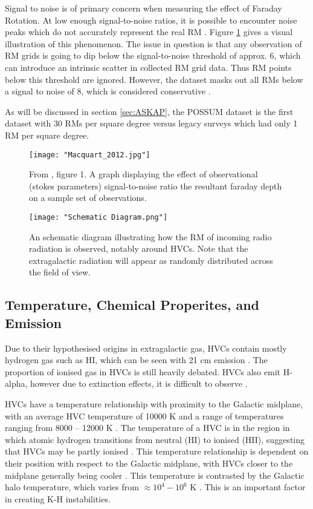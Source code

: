 Signal to noise is of primary concern when measuring the effect of Faraday Rotation. At low enough signal-to-noise ratios, it is possible to encounter noise peaks which do not accurately represent the real RM \citep{ID60}. Figure \ref{fig:snr} gives a visual illustration of this phenomenon. The issue in question is that any observation of RM grids is going to dip below the signal-to-noise threshold of approx. 6, which can introduce an intrinsic scatter in collected RM grid data. Thus RM points below this threshold are ignored. However, the dataset masks out all RMs below a signal to noise of 8, which is considered conservative \citep{ID71}.

As will be discussed in section \ref{sec:ASKAP}, the POSSUM dataset is the first dataset with 30 RMs per square degree versus legacy surveys which had only 1 RM per square degree.

\begin{figure}
    \texttt{[image: "Macquart\_2012.jpg"]}
    \centering
    \caption{From \cite{ID60}, figure 1. A graph displaying the effect of observational (stokes parameters) signal-to-noise ratio the resultant faraday depth on a sample set of observations.}
    \label{fig:snr}
\end{figure}

\begin{figure}
    \texttt{[image: "Schematic Diagram.png"]}
    \centering
    \caption{An schematic diagram illustrating how the RM of incoming radio radiation is observed, notably around HVCs. Note that the extragalactic radiation will appear as randomly distributed across the field of view.}
    \label{fig:schema}
\end{figure}

\subsection{Temperature, Chemical Properites, and Emission}
\label{sec:chem}

Due to their hypothesised origins in extragalactic gas, HVCs contain mostly hydrogen gas such as HI, which can be seen with 21 cm emission \citep{ID7, ID8, ID6}. The proportion of ionised gas in HVCs is still heavily debated. HVCs also emit H-alpha, however due to extinction effects, it is difficult to observe \citep{ID9, ID43}.

HVCs have a temperature relationship with proximity to the Galactic midplane, with an average HVC temperature of 10000 K and a range of temperatures ranging from 8000 – 12000 K \citep{ID49, ID48}. The temperature of a HVC is in the region in which atomic hydrogen transitions from neutral (HI) to ionised (HII), suggesting that HVCs may be partly ionised \citep{ID49, ID48, ID68}. This temperature relationship is dependent on their position with respect to the Galactic midplane, with HVCs closer to the midplane generally being cooler \citep{ID48}. This temperature is contrasted by the Galactic halo temperature, which varies from $\approx 10^4-10^6$ K \citep{ID19}. This is an important factor in creating K-H instabilities.


